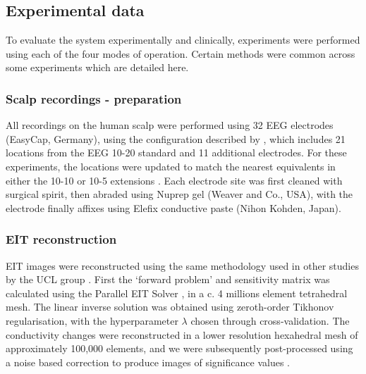 \subsection{Experimental data}

To evaluate the system experimentally and clinically, experiments were performed using each of the four modes of operation. Certain methods were common across some experiments which are detailed here. 

\subsubsection{Scalp recordings - preparation}
All recordings on the human scalp were performed using 32 EEG electrodes (EasyCap, Germany), using the configuration described by \citet{tidswell2001three}, which includes 21 locations from the EEG 10-20 standard \cite{Jasper1958} and 11 additional electrodes. For these experiments, the locations were updated to match the nearest equivalents in either the 10-10 or 10-5 extensions \cite{Oostenveld2001}. Each electrode site was first cleaned with surgical spirit, then abraded using Nuprep gel (Weaver and Co., USA), with the electrode finally affixes using Elefix conductive paste (Nihon Kohden, Japan). 

\subsubsection{EIT reconstruction}
EIT images were reconstructed using the same methodology used in other studies by the UCL group \cite{Dowrick_2016,Aristovich_2016,Aristovich_2014}. First the `forward problem' and sensitivity matrix was calculated using the Parallel EIT Solver \cite{Jehl2014}, in a c. 4 millions element tetrahedral mesh. The linear inverse solution was obtained using zeroth-order Tikhonov regularisation, with the hyperparameter $\lambda$ chosen through cross-validation.  The conductivity changes were reconstructed in a lower resolution hexahedral mesh of approximately 100,000 elements, and we were subsequently post-processed using a noise based correction to produce images of significance values \cite{Aristovich_2016}.